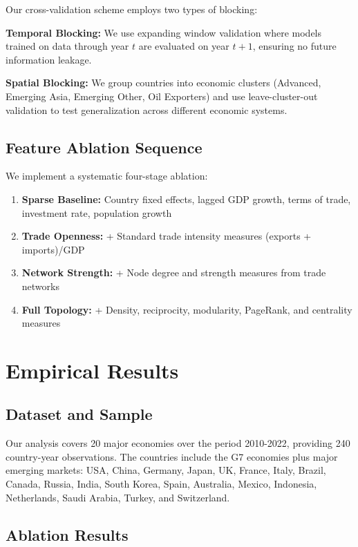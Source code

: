 \documentclass[11pt,a4paper]{article}
\begin{document}
Our cross-validation scheme employs two types of blocking:

\textbf{Temporal Blocking:} We use expanding window validation where models trained on data through year $t$ are evaluated on year $t+1$, ensuring no future information leakage.

\textbf{Spatial Blocking:} We group countries into economic clusters (Advanced, Emerging Asia, Emerging Other, Oil Exporters) and use leave-cluster-out validation to test generalization across different economic systems.

\subsection{Feature Ablation Sequence}

We implement a systematic four-stage ablation:

\begin{enumerate}
\item \textbf{Sparse Baseline:} Country fixed effects, lagged GDP growth, terms of trade, investment rate, population growth
\item \textbf{Trade Openness:} + Standard trade intensity measures (exports + imports)/GDP
\item \textbf{Network Strength:} + Node degree and strength measures from trade networks
\item \textbf{Full Topology:} + Density, reciprocity, modularity, PageRank, and centrality measures
\end{enumerate}

\section{Empirical Results}

\subsection{Dataset and Sample}

Our analysis covers 20 major economies over the period 2010-2022, providing 240 country-year observations. The countries include the G7 economies plus major emerging markets: USA, China, Germany, Japan, UK, France, Italy, Brazil, Canada, Russia, India, South Korea, Spain, Australia, Mexico, Indonesia, Netherlands, Saudi Arabia, Turkey, and Switzerland.

\subsection{Ablation Results}
\end{document}
